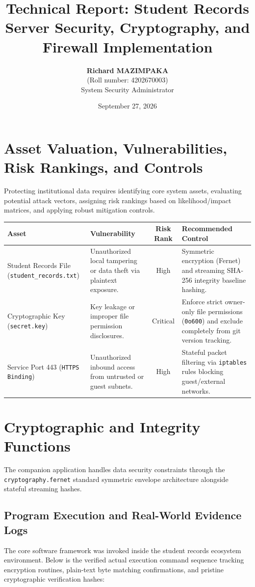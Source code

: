 \documentclass[11pt,a4paper]{article}
\title{\textbf{Technical Report: Student Records Server Security, Cryptography, and Firewall Implementation}}
\author{\textbf{Richard MAZIMPAKA} \\ (Roll number: 4202670003) \\ System Security Administrator}
\date{September 27, 2026}
\begin{document}
\maketitle

\section{Asset Valuation, Vulnerabilities, Risk Rankings, and Controls}
Protecting institutional data requires identifying core system assets, evaluating potential attack vectors, assigning risk rankings based on likelihood/impact matrices, and applying robust mitigation controls.

\begin{table}[h]
\centering
\small
\begin{tabular}{p{3.2cm} p{3.2cm} c p{5.5cm}}
\toprule
\textbf{Asset} & \textbf{Vulnerability} & \textbf{Risk Rank} & \textbf{Recommended Control} \\
\midrule
Student Records File (\texttt{student\_records.txt}) & Unauthorized local tampering or data theft via plaintext exposure. & High & Symmetric encryption (Fernet) and streaming SHA-256 integrity baseline hashing. \\
\addlinespace
Cryptographic Key (\texttt{secret.key}) & Key leakage or improper file permission disclosures. & Critical & Enforce strict owner-only file permissions (\texttt{0o600}) and exclude completely from git version tracking. \\
\addlinespace
Service Port 443 (\texttt{HTTPS Binding}) & Unauthorized inbound access from untrusted or guest subnets. & High & Stateful packet filtering via \texttt{iptables} rules blocking guest/external networks. \\
\bottomrule
\end{tabular}
\end{table}

\section{Cryptographic and Integrity Functions}
The companion application handles data security constraints through the \texttt{cryptography.fernet} standard symmetric envelope architecture alongside stateful streaming hashes.

\subsection{Program Execution and Real-World Evidence Logs}
The core software framework was invoked inside the student records ecosystem environment. Below is the verified actual execution command sequence tracking encryption routines, plain-text byte matching confirmations, and pristine cryptographic verification hashes:
\end{document}
